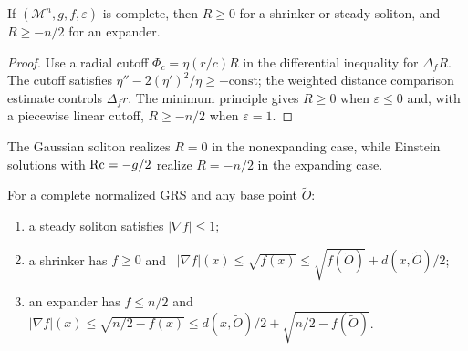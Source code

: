 \begin{theorem}
\label{thm:chow-iv-scalar-curvature-lower-bound}


If $(\mathcal M^n,g,f,\varepsilon)$ is complete, then $R\ge0$ for a shrinker
or steady soliton, and $R\ge-n/2$ for an expander.
\end{theorem}
\begin{proof}
\sketch
Use a radial cutoff $\Phi_c=\eta(r/c)R$ in the differential inequality for
$\Delta_fR$.  The cutoff satisfies
$\eta''-2(\eta')^2/\eta\ge-\mathrm{const}$; the weighted distance comparison
estimate controls $\Delta_fr$.  The minimum principle gives $R\ge0$ when
$\varepsilon\le0$ and, with a piecewise linear cutoff, $R\ge-n/2$ when
$\varepsilon=1$.
\end{proof}

\begin{remark}
\label{rem:chow-iv-scalar-lower-sharp}


The Gaussian soliton realizes $R=0$ in the nonexpanding case, while Einstein
solutions with $\operatorname{Rc}=-g/2$ realize $R=-n/2$ in the expanding case.
\end{remark}

\begin{theorem}
\label{thm:chow-iv-gradient-potential-bounds}


For a complete normalized GRS and any base point $\widetilde O$:
\begin{enumerate}
\item a steady soliton satisfies $|\nabla f|\le1$;
\item a shrinker has $f\ge0$ and
\ $|\nabla f|(x)\le\sqrt{f(x)}\le\sqrt{f(\widetilde O)}+d(x,\widetilde O)/2$;
\item an expander has $f\le n/2$ and
\ $|\nabla f|(x)\le\sqrt{n/2-f(x)}\le d(x,\widetilde O)/2+\sqrt{n/2-f(\widetilde O)}$.
\end{enumerate}
\end{theorem}

